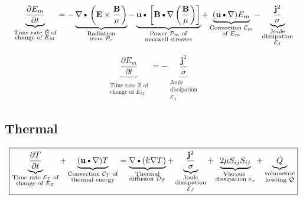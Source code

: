 \documentclass[11pt]{article}
\newcommand{\B}{\mathbf{B}}
\newcommand{\MC}{\mathcal}
\newcommand{\PD}{\partial}
\newcommand{\BM}{\frac{\mathbf{B}}{\mu}}
\newcommand{\E}{\mathbf{E}}
\newcommand{\JSS}{\frac{\mathbf{j}^2}{\sigma}}
\newcommand{\U}{\mathbf{u}}
\newcommand{\DOT}{\text{\textbullet}}
\begin{document}
\begin{equation}
	\underbrace{\frac{\PD E_m}{\PD t} }_
	{\substack{\text{Time rate $\dot{\MC B}$ of}\\\text{change of $E_M$}}}
	=
	- \underbrace{\nabla \DOT \left(\E \times \BM \right)}_
	{\substack{\text{Radiation}\\\text{term $\MC P_{r}$}}}
	- \underbrace{\U \DOT \left[\B \DOT \nabla \left( \BM \right) \right]}_
	{\substack{\text{Power $\MC P_{m}$ of}\\\text{maxwell stresses}}}
	+ \underbrace{(\U \DOT \nabla) E_m}_
	{\substack{\text{Convection $\MC C_m$}\\\text{of $E_m$}}}
	- \underbrace{\JSS}_
	{\substack{\text{Joule}\\\text{dissipation}\\\text{$\MC E_J$}}}
\end{equation}

\begin{equation}
	\underbrace{\frac{\PD E_m}{\PD t} }_
	{\substack{\text{Time rate $\dot{\MC B}$ of}\\\text{change of $E_M$}}}
	=
	- \underbrace{\JSS}_
	{\substack{\text{Joule}\\\text{dissipation}\\\text{$\MC E_J$}}}
\end{equation}

\subsection{Thermal}
\begin{equation}
	\boxed{
	\underbrace{\frac{\PD T}{\PD t}}_{\substack{\text{Time rate $\MC E_T$ of} \\ \text{change of $E_T$}}} +
	\underbrace{(\U \DOT \nabla) T}_{\substack{\text{Convection $\MC C_T$ of} \\ \text{thermal energy}}}
	= 
	\underbrace{\nabla \DOT (k \nabla T)}_{\substack{\text{Thermal} \\ \text{diffusion } \MC D_T}} + 
	\underbrace{\JSS}_
	{\substack{\text{Joule}\\\text{dissipation}\\\text{$\MC E_J$}}} +
	\underbrace{2 \mu S_{ij}S_{ij}}_{\substack{\text{Viscous } \\ \text{dissipation } \varepsilon_v}} +
	\underbrace{\dot{Q}}_{\substack{\text{volumetric} \\ \text{heating } \dot{\MC Q}}}
	}
\end{equation}
\end{document}
